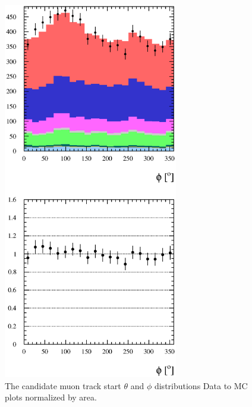 \begin{figure}[h]
  \includegraphics[width=3in]{Figures/P0DTrkPhiRun1Run2-normByRatio.eps}
  \caption{The candidate muon track start $\theta$ and $\phi$ distributions 
Data to MC plots normalized by area.}
  \label{fig:ResultsNorm}%
\end{figure}
